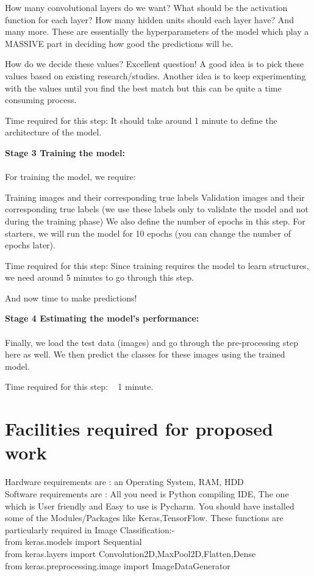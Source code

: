 \documentclass{article}
\begin{document}
How many convolutional layers do we want?
What should be the activation function for each layer?
How many hidden units should each layer have?
And many more. These are essentially the hyperparameters of the model which play a MASSIVE part in deciding how good the predictions will be.

How do we decide these values? Excellent question! A good idea is to pick these values based on existing research/studies. Another idea is to keep experimenting with the values until you find the best match but this can be quite a time consuming process.

Time required for this step: It should take around 1 minute to define the architecture of the model.

\textbf {{\Large Stage 3 Training the model:}}\\
\\For training the model, we require:

Training images and their corresponding true labels
Validation images and their corresponding true labels (we use these labels only to validate the model and not during the training phase)
We also define the number of epochs in this step. For starters, we will run the model for 10 epochs (you can change the number of epochs later).

Time required for this step: Since training requires the model to learn structures, we need around 5 minutes to go through this step.

And now time to make predictions!

\textbf {{\Large  Stage 4 Estimating the model’s performance:}}\\
\\Finally, we load the test data (images) and go through the pre-processing step here as well. We then predict the classes for these images using the trained model.

Time required for this step: ~ 1 minute.

\section{ Facilities required for proposed work}
Hardware requirements are : an Operating System, RAM, HDD\\ 
Software requirements are : 
All you need is Python compiling IDE,
The one which is User friendly and Easy to use is Pycharm.
You should have installed some of the Modules/Packages like
Keras,TensorFlow.
These functions are particularly required in Image Classification:-\\
from keras.models import Sequential\\
from keras.layers import Convolution2D,MaxPool2D,Flatten,Dense\\
from keras.preprocessing.image import ImageDataGenerator\\
\end{document}
